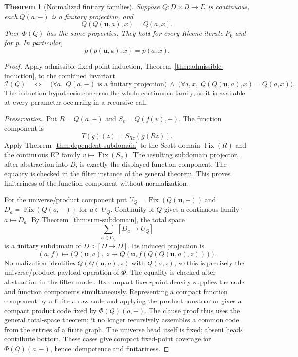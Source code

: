 \documentclass[11pt,a4paper]{article}
\newtheorem{theorem}{Theorem}[section]
\theoremstyle{definition}
\theoremstyle{remark}
\begin{document}
\begin{theorem}[Normalized finitary families]\label{thm:normalized-finitary}
Suppose $Q:D\times D\to D$ is continuous, each $Q(a,-)$ is a finitary
projection, and
\[
 Q(Q(\mathbf u,a),x)=Q(a,x).
\]
Then $\Phi(Q)$ has the same properties. They hold for every Kleene
iterate $P_k$ and for $p$. In particular,
\[
 p(p(\mathbf u,a),x)=p(a,x).
\]
\end{theorem}
\begin{proof}
Apply admissible fixed-point induction, Theorem~\ref{thm:admissible-induction},
to the combined invariant
\[
 \mathcal I(Q)\quad\Longleftrightarrow\quad
 \bigl(\forall a,\;Q(a,-)\text{ is a finitary projection}\bigr)
 \;\wedge\;
 \bigl(\forall a,x,\;Q(Q(\mathbf u,a),x)=Q(a,x)\bigr).
\]
The induction hypothesis concerns the whole continuous family, so it
is available at every parameter occurring in a recursive call.

\emph{Preservation.}
Put $R=Q(a,-)$ and $S_v=Q(f(v),-)$. The function component is
\[
 T(g)(z)=S_{Rz}(g(Rz)).
\]
Apply Theorem~\ref{thm:dependent-subdomain} to the Scott domain
$\operatorname{Fix}(R)$ and the continuous EP family
$v\mapsto\operatorname{Fix}(S_v)$. The resulting subdomain projector,
after abstraction into $D$, is exactly the displayed function component.
The equality is checked in the filter instance of the general theorem.
This proves finitariness of the function component without normalization.

For the universe/product component put
$U_Q=\operatorname{Fix}(Q(\mathbf u,-))$ and
$D_a=\operatorname{Fix}(Q(a,-))$ for $a\in U_Q$.
Continuity of $Q$ gives a continuous family $a\mapsto D_a$.
By Theorem~\ref{thm:sum-subdomain}, the total space
\[
 \sum_{a\in U_Q}[D_a\to U_Q]
\]
is a finitary subdomain of $D\times[D\to D]$.
Its induced projection is
\[
 (a,f)\longmapsto
 \bigl(Q(\mathbf u,a),\ z\mapsto
 Q(\mathbf u,f(Q(Q(\mathbf u,a),z)))\bigr).
\]
Normalization identifies $Q(Q(\mathbf u,a),z)$ with $Q(a,z)$, so this
is precisely the universe/product payload operation of $\Phi$.
The equality is checked after abstraction in the filter model.
Its compact fixed-point density supplies the code and function
components simultaneously. Representing a compact function component
by a finite arrow code and applying the product constructor gives a
compact product code fixed by $\Phi(Q)(a,-)$.
The clause proof thus uses the general total-space theorem; it no longer
recursively assembles a common code from the entries of a finite graph.
The universe head itself is fixed; absent heads contribute bottom.
These cases give compact fixed-point coverage for $\Phi(Q)(a,-)$,
hence idempotence and finitariness.


\end{proof}
\end{document}
